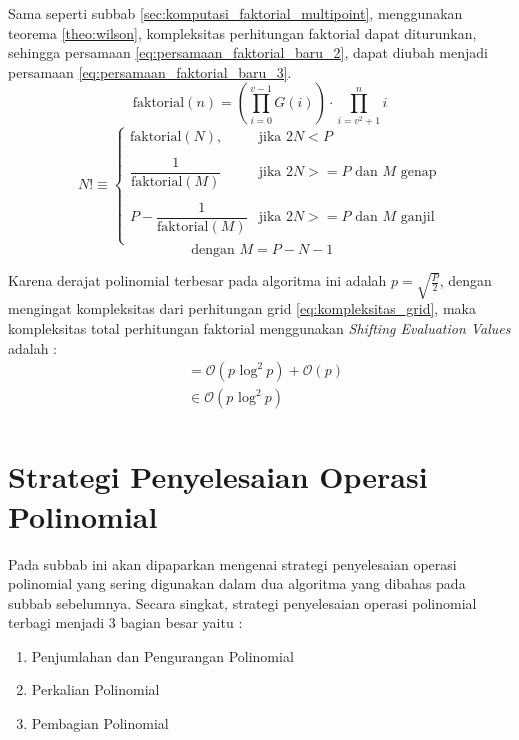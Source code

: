 Sama seperti subbab \ref{sec:komputasi_faktorial_multipoint}, menggunakan teorema \ref{theo:wilson}, kompleksitas perhitungan faktorial dapat diturunkan, sehingga persamaan \eqref{eq:persamaan_faktorial_baru_2}, dapat diubah menjadi persamaan \eqref{eq:persamaan_faktorial_baru_3}.
$$ \text{faktorial}(n) = \left( \prod_{i=0}^{v-1} G(i) \right) \cdot \prod_{i=v^2+1}^n i $$
\begin{equation}
	N! \equiv
	\begin{cases}
		\text{faktorial}(N), 	      & \text{jika } 2N < P \\\\
		\dfrac{1}{\text{faktorial}(M)}
		& \text{jika } 2N >= P \text{ dan } M \text{ genap}\\\\
		P -\dfrac{1}{\text{faktorial}(M)}
		& \text{jika } 2N >= P \text{ dan } M \text{ ganjil} \\
	\end{cases}
	\label{eq:persamaan_faktorial_baru_3}
\end{equation}
$$ \text{ dengan } M = P-N-1 $$

Karena derajat polinomial terbesar pada algoritma ini adalah $ p = \sqrt{\frac{P}{2}} $, dengan mengingat kompleksitas dari perhitungan grid \eqref{eq:kompleksitas_grid}, maka kompleksitas total perhitungan faktorial menggunakan \textit{Shifting Evaluation Values} adalah :
\begin{equation}
	\begin{aligned}
		&= \mathcal{O}{(p \text{ log}^2\ p)} + \mathcal{O}{(p)} \\
		&\in \mathcal{O}{(p \text{ log}^2\ p)} \\
	\end{aligned}
	\label{eq:kompleksitas_shifting_eval_faktorial}
\end{equation}

\section{Strategi Penyelesaian Operasi Polinomial}
Pada subbab ini akan dipaparkan mengenai strategi penyelesaian operasi polinomial yang sering digunakan dalam dua algoritma yang dibahas pada subbab sebelumnya. Secara singkat, strategi penyelesaian operasi polinomial terbagi menjadi 3 bagian besar yaitu :
\begin{enumerate}
	\item Penjumlahan dan Pengurangan Polinomial
	\item Perkalian Polinomial
	\item Pembagian Polinomial
\end{enumerate}

